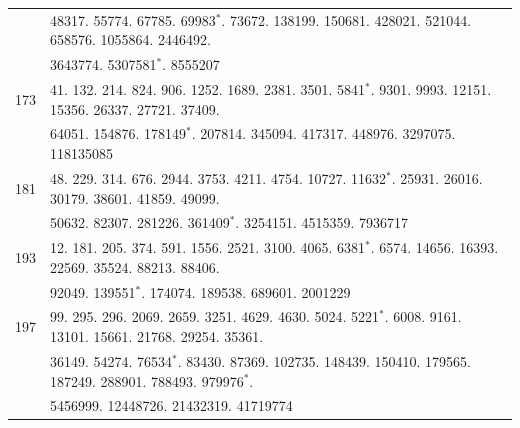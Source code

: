\documentclass[10pt,a4paper]{article}
\begin{document}
\begin{center}
\begin{tabular}{r | l}
    & 48317. 55774. 67785. 69983$^*$. 73672. 138199. 150681. 428021. 521044. 658576. 1055864. 2446492. \\
    & 3643774. 5307581$^*$. 8555207 \\
173 & 41. 132. 214. 824. 906. 1252. 1689. 2381. 3501. 5841$^*$. 9301. 9993. 12151. 15356. 26337. 27721. 37409. \\
    & 64051. 154876. 178149$^*$. 207814. 345094. 417317. 448976. 3297075. 118135085 \\
181 & 48. 229. 314. 676. 2944. 3753. 4211. 4754. 10727. 11632$^*$. 25931. 26016. 30179. 38601. 41859. 49099. \\
    & 50632. 82307. 281226. 361409$^*$. 3254151. 4515359. 7936717 \\
193 & 12. 181. 205. 374. 591. 1556. 2521. 3100. 4065. 6381$^*$. 6574. 14656. 16393. 22569. 35524. 88213. 88406. \\
    & 92049. 139551$^*$. 174074. 189538. 689601. 2001229 \\
197 & 99. 295. 296. 2069. 2659. 3251. 4629. 4630. 5024. 5221$^*$. 6008. 9161. 13101. 15661. 21768. 29254. 35361. \\
    & 36149. 54274. 76534$^*$. 83430. 87369. 102735. 148439. 150410. 179565. 187249. 288901. 788493. 979976$^*$. \\
    & 5456999. 12448726. 21432319. 41719774 \\
\end{tabular}
\end{center}

\smallskip
\end{document}
